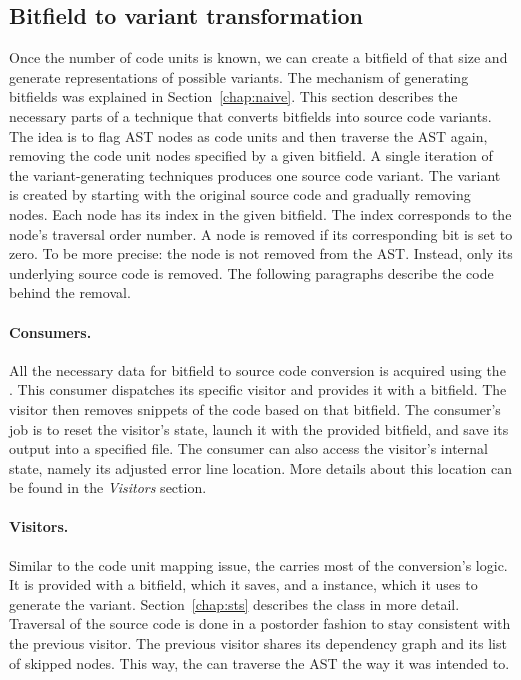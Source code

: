 \subsection{Bitfield to variant transformation}\label{chap:variants}

Once the number of code units is known, we can create a bitfield of that 
size and generate representations of possible variants. 
The mechanism of generating bitfields was explained in 
Section~\ref{chap:naive}. 
This section describes the necessary parts of a technique that converts 
bitfields into source code variants. 
The idea is to flag AST nodes as code units and then traverse the AST again, 
removing the code unit nodes specified by a given bitfield. 
A single iteration of the variant-generating techniques produces one source 
code variant. 
The variant is created by starting with the original source code and 
gradually removing nodes. 
Each node has its index in the given bitfield. 
The index corresponds to the node's traversal order number. 
A node is removed if its corresponding bit is set to zero. 
To be more precise: the node is not removed from the AST. 
Instead, only its underlying source code is removed. 
The following paragraphs describe the code behind the removal.

\paragraph{Consumers.} All the necessary data for bitfield to source code 
conversion is acquired using the . 
This consumer dispatches its specific visitor and provides it with 
a bitfield. 
The visitor then removes snippets of the code based on that bitfield.
The consumer's job is to reset the visitor's state, launch it with 
the provided bitfield, and save its output into a specified file. 
The consumer can also access the visitor's internal state, namely its 
adjusted error line location. 
More details about this location can be found in the \emph{Visitors} section.

\paragraph{Visitors.} Similar to the code unit mapping issue, 
the  carries most of the conversion's 
logic.
It is provided with a bitfield, which it saves, and a  
instance, which it uses to generate the variant.
Section~\ref{chap:sts} describes the  class in more detail.
Traversal of the source code is done in a postorder fashion to stay 
consistent with the previous visitor. 
The previous visitor shares its dependency graph and its list of skipped 
nodes.
This way, the  can traverse the AST the way 
it was intended to. 

